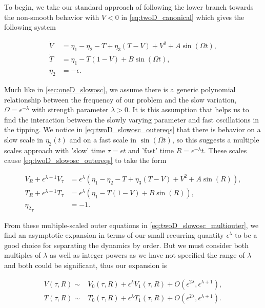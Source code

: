 To begin, we take our standard approach of following the lower branch towards the non-smooth behavior with $V<0$ in \eqref{eq:twoD_canonical} which gives the following system  

\begin{equation}\label{eq:twoD_slowosc_outereqs}
 \begin{aligned}
   \dot{V} & =  \eta_1-\eta_2-T+\eta_3(T-V)+V^2+A\sin(\Omega t), \\
   \dot{T} & =  \eta_1-T(1-V)+B\sin(\Omega t),  \\
  \dot{\eta_2}  & =  -\epsilon.
  \end{aligned}
\end{equation}

Much like in \autoref{sec:oneD_slowosc}, we assume there is a generic polynomial relationship between the frequency of our problem and the slow variation, $\Omega = \epsilon^{-\lambda}$ with strength parameter $\lambda>0$. It is this assumption that helps us to find the interaction between the slowly varying parameter and fast oscillations in the tipping. We notice in \eqref{eq:twoD_slowosc_outereqs} that there is behavior on a slow scale in $\eta_2(t)$ and on a fast scale in $\sin(\Omega t)$, so this suggests a multiple scales approach with 'slow' time $\tau = \epsilon t$ and 'fast' time $R=\epsilon^{-\lambda}t$. These scales cause \eqref{eq:twoD_slowosc_outereqs} to take the form

\begin{equation}\label{eq:twoD_slowosc_multiouter}
 \begin{aligned}
V_R+\epsilon^{\lambda+1}V_\tau & = \epsilon^{\lambda} \left(\eta_1-\eta_2-		T+\eta_3(T-V)+V^2+A\sin(R)\right), \\
T_R+\epsilon^{\lambda+1}T_\tau & = \epsilon^{\lambda}\left( \eta_1-T(1-		  V)+B\sin(R)\right),  \\
	{\eta_2}_\tau  & =  -1.
\end{aligned}
\end{equation}
  
From these multiple-scaled outer equations in \eqref{eq:twoD_slowosc_multiouter}, we find an asymptotic expansion in terms of our small recurring quantity $\epsilon^\lambda$ to be a good choice for separating the dynamics by order. But we must consider both multiples of $\lambda$ as well as integer powers as we have not specified the range of $\lambda$ and both could be significant, thus our expansion is

\begin{equation}\label{eq:twoD_slowosc_outerexpansion}
	\begin{aligned}
		V(\tau,R)\sim& V_0(\tau,R)+\epsilon^\lambda 	V_1(\tau,R)+O(\epsilon^{2\lambda},\epsilon^{\lambda+1}),\\
        T(\tau,R)\sim& T_0(\tau,R)+\epsilon^\lambda T_1(\tau,R)+O(\epsilon^{2\lambda},\epsilon^{\lambda+1}).
	\end{aligned}
\end{equation}


